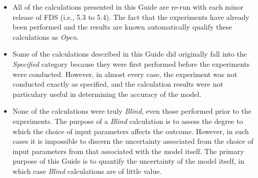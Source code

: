 \begin{itemize}
\item All of the calculations presented in this Guide are re-run with each minor release of FDS (i.e., 5.3 to 5.4). The
fact that the experiments have already been performed and the results are known automatically qualify these
calculations as {\em Open}.
\item Some of the calculations described in this Guide did originally fall into the {\em Specified} category because they
were first performed before the experiments were conducted. However, in almost every case, the experiment was not conducted
exactly as specified, and the calculation results were not particulary useful in determining the accuracy of the model.
\item None of the calculations were truly {\em Blind}, even those performed prior to the experiments. The purpose of a
{\em Blind} calculation is to assess the degree to which the choice of input parameters affects the outcome. However,
in such cases it is impossible to discern the uncertainty associated from the choice of input parameters from that associated
with the model itself. The primary purpose of this Guide is to quantify the uncertainty of the model itself, in which
case {\em Blind} calculations are of little value.
\end{itemize}
